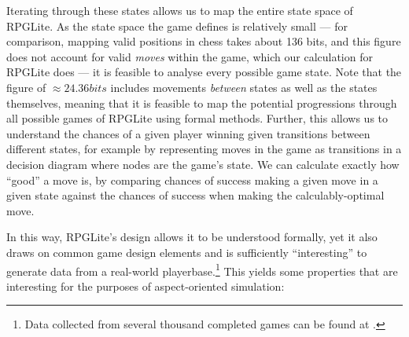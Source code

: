 Iterating through these states allows us to map the entire state space of RPGLite. As the state space the game defines is relatively small --- for comparison, mapping valid positions in chess takes about 136 bits\cite{information_content_chess}, and this figure does not account for valid \emph{moves} within the game, which our calculation for RPGLite does --- it is feasible to analyse every possible game state. Note that the figure of \(\approx 24.36 bits\) includes movements \emph{between} states as well as the states themselves, meaning that it is feasible to map the potential progressions through all possible games of RPGLite using formal methods. Further, this allows us to understand the chances of a given player winning given transitions between different states, for example by representing moves in the game as transitions in a decision diagram where nodes are the game's state. We can calculate exactly how ``good'' a move is, by comparing chances of success making a given move in a given state against the chances of success when making the calculably-optimal move.
 
In this way, RPGLite's design allows it to be understood formally, yet it also draws on common game design elements and is sufficiently ``interesting'' to generate data from a real-world playerbase.\footnote{Data collected from several thousand completed games can be found at \cite{rpglite_dataset}.} This yields some properties that are interesting for the purposes of aspect-oriented simulation:

